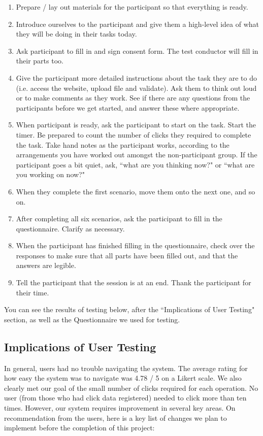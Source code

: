 \documentclass[10pt]{article}
\begin{document}
\begin{enumerate}
\item Prepare / lay out materials for the participant so that everything is ready.
\item Introduce ourselves to the participant and give them a high-level idea of what they will be doing in their tasks today.
\item Ask participant to fill in and sign consent form. The test conductor will fill in their parts too.
\item Give the participant more detailed instructions about the task they are to do (i.e. access the website, upload file and validate). Ask them to think out loud or to make comments as they work. See if there are any questions from the participants before we get started, and answer these where appropriate.
\item When participant is ready, ask the participant to start on the task. Start the timer. Be prepared to count the number of clicks they required to complete the task. Take hand notes as the participant works, according to the arrangements you have worked out amongst the non-participant group. If the participant goes a bit quiet, ask, ``what are you thinking now?" or ``what are you working on now?"
\item When they complete the first scenario, move them onto the next one, and so on.
\item After completing all six scenarios, ask the participant to fill in the questionnaire. Clarify as necessary.
\item When the participant has finished filling in the questionnaire, check over the responses to make sure that all parts have been filled out, and that the answers are legible.
\item Tell the participant that the session is at an end. Thank the participant for their time.
\end{enumerate}

You can see the results of testing below, after the ``Implications of User Testing" section, as well as the Questionnaire we used for testing.

\subsection*{Implications of User Testing}

In general, users had no trouble navigating the system. The average rating for how easy the system was to navigate was 4.78 / 5 on a Likert scale. We also clearly met our goal of the small number of clicks required for each operation. No user (from those who had click data registered) needed to click more than ten times. However, our system requires improvement in several key areas. On recommendation from the users, here is a key list of changes we plan to implement before the completion of this project:
\end{document}
